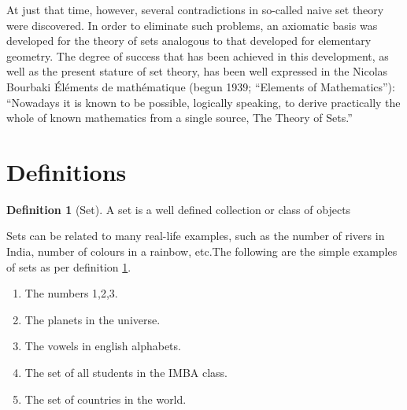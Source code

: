 \documentclass[
]{book}
\theoremstyle{definition}
\newtheorem{definition}{Definition}[chapter]
\theoremstyle{definition}
\theoremstyle{definition}
\theoremstyle{definition}
\theoremstyle{remark}
\begin{document}
At just that time, however, several contradictions in so-called naive set theory were discovered. In order to eliminate such problems, an axiomatic basis was developed for the theory of sets analogous to that developed for elementary geometry. The degree of success that has been achieved in this development, as well as the present stature of set theory, has been well expressed in the Nicolas Bourbaki Éléments de mathématique (begun 1939; ``Elements of Mathematics''): ``Nowadays it is known to be possible, logically speaking, to derive practically the whole of known mathematics from a single source, The Theory of Sets.''

\hypertarget{definitions}{%
\section{Definitions}\label{definitions}}

\begin{definition}[Set]
\protect\hypertarget{def:set}{}\label{def:set}A set is a well defined collection or class of objects
\end{definition}

Sets can be related to many real-life examples, such as the number of rivers in India, number of colours in a rainbow, etc.The following are the simple examples of sets as per definition \ref{def:set}.

\begin{enumerate}
\def\labelenumi{\arabic{enumi}.}
\item
  The numbers 1,2,3.
\item
  The planets in the universe.
\item
  The vowels in english alphabets.
\item
  The set of all students in the IMBA class.
\item
  The set of countries in the world.
\end{enumerate}
\end{document}
